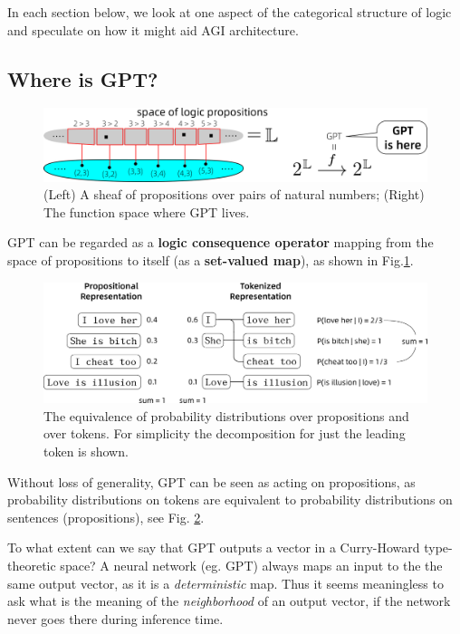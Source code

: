 \documentclass[runningheads]{llncs}
\begin{document}
In each section below, we look at one aspect of the categorical structure of logic and speculate on how it might aid AGI architecture.

\subsection{Where is GPT?}

\begin{figure}
	\includegraphics[scale=.5]{GPT-is-here.png}
	\caption{(Left) A sheaf of propositions over pairs of natural numbers; (Right) The function space where GPT lives.}
	\label{fig:GPT-is-here}
\end{figure}

GPT \cite{chatGPT2020} can be regarded as a \textbf{logic consequence operator} mapping from the space of propositions to itself (as a \textbf{set-valued map}), as shown in Fig.\ref{fig:GPT-is-here}.

\begin{figure}
	\includegraphics[scale=.4]{I-love-her-she-is-bitch.png}	%
	\caption{The equivalence of probability distributions over propositions and over tokens. For simplicity the decomposition for just the leading token is shown.} \label{fig:she-is-bitch}
\end{figure}

Without loss of generality, GPT can be seen as acting on propositions, as probability distributions on tokens are equivalent to probability distributions on sentences (propositions), see Fig. \ref{fig:she-is-bitch}.

To what extent can we say that GPT outputs a vector in a Curry-Howard type-theoretic space?  A neural network (eg. GPT) always maps an input to the the same output vector, as it is a \textit{deterministic} map. Thus it seems meaningless to ask what is the meaning of the \textit{neighborhood} of an output vector, if the network never goes there during inference time.
\end{document}
